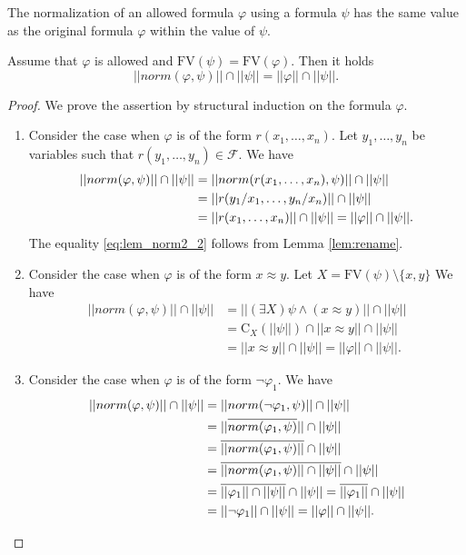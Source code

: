 \documentclass{lmcs}
\def\C{\textrm{C}}
\def\F{\mathcal F}
\def\norm{norm}
\def\FV{\textrm{FV}}
\begin{document}
The normalization of an allowed formula $\varphi$ using a formula $\psi$ has the same value as the original formula $\varphi$ within the value of $\psi$.   
\begin{lem}\label{lem:norm2}
Assume that $\varphi$ is allowed and $\FV(\psi)=\FV(\varphi)$. Then it holds
$$||\norm(\varphi,\psi)||\cap||\psi||=||\varphi||\cap||\psi||.$$ 
\end{lem}
\begin{proof} We prove the assertion by structural induction on the formula $\varphi$.
\begin{enumerate}
\item Consider the case when $\varphi$ is of the form $r(x_1,\ldots,x_n)$. Let $y_1,\ldots,y_n$ be variables such that $r(y_1,\ldots,y_n)\in\F$. We have
\begin{align}
 ||\norm(\varphi,\psi)||\cap||\psi||&=||\norm(r(x_1,\ldots,x_n),\psi)||\cap||\psi||\notag\\
 &=||r(y_1/x_1,\ldots,y_n/x_n)||\cap||\psi||\notag\\
 &=||r(x_1,\ldots,x_n)||\cap||\psi||=||\varphi||\cap||\psi||.\label{eq:lem_norm2_2}
\end{align}
The equality \eqref{eq:lem_norm2_2} follows from Lemma \ref{lem:rename}.
\item Consider the case when $\varphi$ is of the form $x\approx y$. Let $X=\FV(\psi)\setminus\{x,y\}$ We have
\begin{align*}
||\norm(\varphi,\psi)||\cap||\psi||&=||(\exists X)\psi\wedge(x\approx y)||\cap||\psi||\\
&=\C_X(||\psi||)\cap||x\approx y||\cap||\psi||\\
&=||x\approx y||\cap||\psi||=||\varphi||\cap||\psi||.
\end{align*}
\item Consider the case when $\varphi$ is of the form $\neg\varphi_1$. We have
\begin{align}
||\norm(\varphi,\psi)||\cap||\psi||&=||\norm(\neg\varphi_1,\psi)||\cap||\psi||\notag\\
&=||\overline{\norm(\varphi_1,\psi)}||\cap||\psi||\notag\\
&=\overline{||\norm(\varphi_1,\psi)||}\cap||\psi||\notag\\
&=\overline{||\norm(\varphi_1,\psi)||\cap||\psi||}\cap||\psi||\notag\\
&=\overline{||\varphi_1||\cap||\psi||}\cap||\psi||=\overline{||\varphi_1||}\cap||\psi||\notag\\
&=||\neg\varphi_1||\cap||\psi||=||\varphi||\cap||\psi||.\notag

\end{align}
\end{enumerate}
\end{proof}
\end{document}
